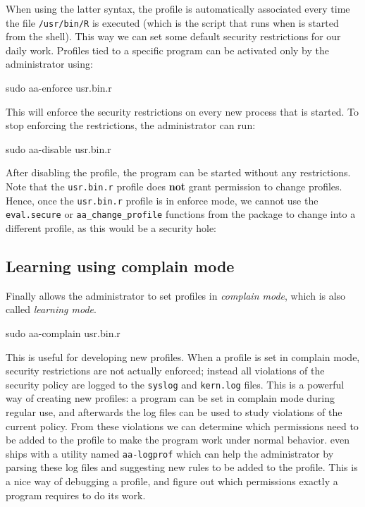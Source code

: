 When using the latter syntax, the profile is automatically associated every
time the file \texttt{/usr/bin/R} is executed (which is the script that runs
when \R is started from the shell). This way we can set some default security
restrictions for our daily work. Profiles tied to a specific program can be
activated only by the administrator using:
\begin{codeblock}
sudo aa-enforce usr.bin.r
\end{codeblock}
This will enforce the security restrictions on every new \R process that is
started. To stop enforcing the restrictions, the administrator can run:
\begin{codeblock}
sudo aa-disable usr.bin.r
\end{codeblock}
After disabling the profile, the \R program can be started without any
restrictions.
Note that the \texttt{usr.bin.r} profile does \textbf{not} grant permission to
change profiles. Hence, once the \texttt{usr.bin.r} profile is in enforce mode,
we cannot use the \texttt{eval.secure} or \texttt{aa\_change\_profile} functions
from the \RAppArmor package to change into a different profile, as this
would be a security hole:



\subsection{Learning using complain mode}

Finally \AppArmor allows the administrator to set profiles in \emph{complain
mode}, which is also called \emph{learning mode}.
\begin{codeblock}
sudo aa-complain usr.bin.r
\end{codeblock}
This is useful for developing new profiles. When a profile is set in complain
mode, security restrictions are not actually enforced; instead all violations
of the security policy are logged to the \texttt{syslog} and \texttt{kern.log}
files. This is a powerful way of creating new profiles: a program can be set in
complain mode during regular use, and afterwards the log files can be used to
study violations of the current policy. From these violations we can determine
which permissions need to be added to the profile to make the program work
under normal behavior. \AppArmor even ships with a utility named
\texttt{aa-logprof} which can help the administrator by parsing these log files and
suggesting new rules to be added to the profile. This is a nice way of
debugging a profile, and figure out which permissions exactly a program
requires to do its work.

